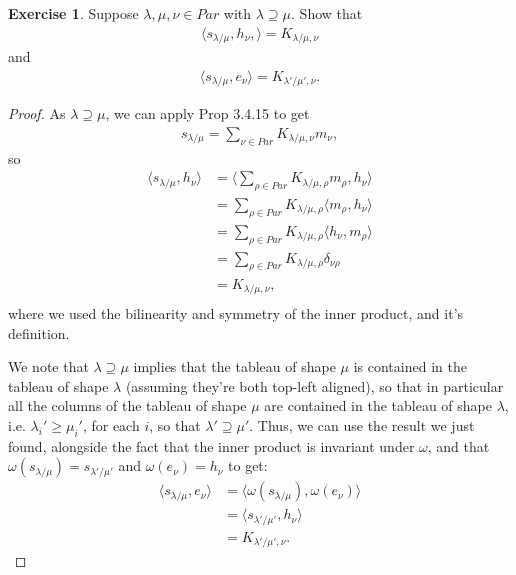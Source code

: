 \documentclass[12pt]{extarticle}
\newcommand{\<}{\langle}
\renewcommand{\>}{\rangle}
\theoremstyle{definition}
\newtheorem{exercise}{Exercise}
\begin{document}
\begin{exercise}
  Suppose $\lambda, \mu, \nu \in Par$ with $\lambda \supseteq \mu$. Show that
  \begin{align*}
    \< s_{\lambda / \mu}, h_{\nu}, \> = K_{\lambda/\mu, \nu}
  \end{align*}
  and
  \begin{align*}
    \< s_{\lambda / \mu}, e_{\nu} \> = K_{\lambda' / \mu', \nu}.
  \end{align*}
\end{exercise}
\begin{proof}
  As $\lambda \supseteq \mu$, we can apply Prop 3.4.15 to get
  \begin{align*}
    s_{\lambda/\mu} = \sum\limits_{\nu \in Par} K_{\lambda/\mu, \nu} m_{\nu},
  \end{align*}
  so
  \begin{align*}
    \< s_{\lambda / \mu}, h_{\nu} \>
    &= \< \sum\limits_{\rho \in Par} K_{\lambda/\mu, \rho} m_{\rho} , h_{\nu} \> \\
    &= \sum\limits_{\rho \in Par} K_{\lambda/\mu, \rho} \< m_{\rho} , h_{\nu} \> \\
    &= \sum\limits_{\rho \in Par} K_{\lambda/\mu, \rho} \< h_{\nu},  m_{\rho} \> \\
    &= \sum\limits_{\rho \in Par} K_{\lambda/\mu, \rho} \delta_{\nu \rho} \\
    &= K_{\lambda/\mu, \nu}, \\    
  \end{align*}
  where we used the bilinearity and symmetry of the inner product, and it's definition.

  We note that $\lambda \supseteq \mu$ implies that the tableau of shape $\mu$ is contained in the tableau of shape $\lambda$ (assuming they're both top-left aligned), so that in particular all the columns of the tableau of shape $\mu$ are contained in the tableau of shape $\lambda$,
  i.e. $\lambda_i' \geq \mu_i'$, for each $i$, so that $\lambda' \supseteq \mu'$. Thus, we can use the result we just found, alongside the fact that the inner product is invariant under $\omega$,
  and that $\omega(s_{\lambda/\mu}) = s_{\lambda'/\mu'}$ and $\omega(e_{\nu}) = h_{\nu}$ to get: 
  \begin{align*}
    \< s_{\lambda / \mu}, e_{\nu} \>
    &= \< \omega(s_{\lambda / \mu}), \omega(e_{\nu}) \> \\
    &= \< s_{\lambda' / \mu'}, h_{\nu} \> \\
    &= K_{\lambda' / \mu', \nu}.
  \end{align*}

\end{proof}
\end{document}
